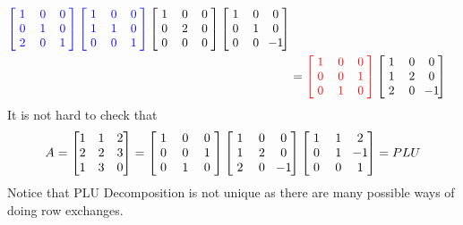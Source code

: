 \begin{solution}
\begin{align*}
\mathcolor{blue}{\left[\begin{array}{@{\,}wc{8pt}wc{6pt}wc{7pt}@{\,}}
1 & 0 & 0 \\
0 & 1 & 0 \\
2 & 0 & 1
\end{array}\right]}
\mathcolor{blue}{\left[\begin{array}{@{\,}wc{8pt}wc{6pt}wc{7pt}@{\,}}
1 & 0 & 0 \\
1 & 1 & 0 \\
0 & 0 & 1
\end{array}\right]}
\left[\begin{array}{@{\,}wc{8pt}wc{6pt}wc{7pt}@{\,}}
1 & 0 & 0 \\
0 & 2 & 0 \\
0 & 0 & 0
\end{array}\right]
\left[\begin{array}{@{\,}wc{8pt}wc{6pt}wc{7pt}@{\,}}
1 & 0 & 0 \\
0 & 1 & 0 \\
0 & 0 & -1
\end{array}\right] \\
&=
\mathcolor{red}{\left[\begin{array}{@{\,}wc{8pt}wc{6pt}wc{7pt}@{\,}}
1 & 0 & 0 \\
0 & 0 & 1 \\
0 & 1 & 0    
\end{array}\right]} 
\left[\begin{array}{@{\,}wc{8pt}wc{6pt}wc{7pt}@{\,}}
1 & 0 & 0 \\
1 & 2 & 0 \\
2 & 0 & -1
\end{array}\right] 
\end{align*}
It is not hard to check that
\begin{align*}
A = \begin{bmatrix}
1 & 1 & 2 \\
2 & 2 & 3 \\
1 & 3 & 0
\end{bmatrix} 
=
\left[\begin{array}{@{\,}wc{8pt}wc{7pt}wc{8pt}@{\,}}
1 & 0 & 0 \\
0 & 0 & 1 \\
0 & 1 & 0    
\end{array}\right] 
\left[\begin{array}{@{\,}wc{8pt}wc{7pt}wc{8pt}@{\,}}
1 & 0 & 0 \\
1 & 2 & 0 \\
2 & 0 & -1
\end{array}\right] 
\left[\begin{array}{@{\,}wc{8pt}wc{7pt}wc{8pt}@{\,}}
1 & 1 & 2 \\
0 & 1 & -1 \\
0 & 0 & 1 
\end{array}\right] 
= PLU
\end{align*}
Notice that PLU Decomposition is not unique as there are many possible ways of doing row exchanges.
\end{solution}

